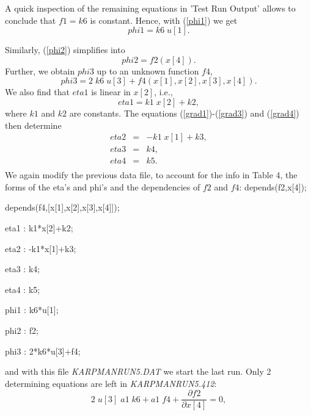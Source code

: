 {\nopagebreak
A quick inspection of the remaining equations in 'Test Run Output'
allows to conclude that $f1 = k6 $ is constant.
Hence, with (\ref{phi1}) we get
\begin{equation}
phi1 = k6 \; u[1] \label{phi1new}.
\end{equation}

\nopagebreak
Similarly, (\ref{phi2}) simplifies into
\begin{equation}
phi2 = f2(x[4]) \label{phi2new}.
\end{equation}
Further, we obtain $phi3$ up to an unknown function 
$f4$,
\begin{equation}
phi3 = 2 \; k6\; u[3] + f4(x[1],x[2],x[3],x[4]).
\label{phi3}
\end{equation}
We also find that $eta1$ is linear in $x[2]$, i.e.,
\begin{equation}
eta1 = k1 \; x[2] + k2,
\label{eta1}
\end{equation}
where $k1$ and $k2$ are constants. 
The equations (\ref{grad1})-(\ref{grad3}) and (\ref{grad4}) 
then determine
\begin{eqnarray}
eta2 & =& - k1 \; x[1] + k3,
\label{eta2} \\
eta3 &=& k4,
\label{eta3} \\
eta4 &=& k5.
\label{eta4} \\ \nonumber
\end{eqnarray}
\nopagebreak
\noindent
We again modify the previous data file, to account for the info
in Table 4, the forms of the eta's and phi's and the dependencies of 
$f2$ and $f4$:
\vskip 2pt
\pagebreak
depends(f2,x[4]); \par
depends(f4,[x[1],x[2],x[3],x[4]]); \par
\par
eta1 : k1*x[2]+k2; \par
eta2 : -k1*x[1]+k3; \par
eta3 : k4; \par
eta4 : k5; \par
phi1 : k6*u[1]; \par
phi2 : f2; \par
phi3 : 2*k6*u[3]+f4; \par
\noindent
and with this file {\em KARPMANRUN5.DAT} we start the last run.
Only 2 determining equations are left 
in {\em KARPMANRUN5.412}:
\begin{equation}
2 \; u[3]\; a1 \; k6 + a1 \; f4
+ \frac{\partial f2}{\partial x[4]} = 0,
\label{k6}
\end{equation}
\begin{equation}

\end{equation}}
